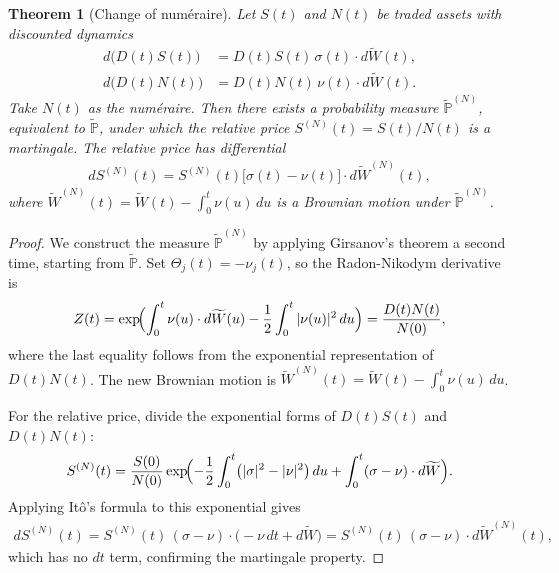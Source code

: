 \documentclass{report}
\theoremstyle{spacedplain}
\newtheorem{theorem}{Theorem}[section]
\theoremstyle{spaceddefinition}
\theoremstyle{spacedremark}
\begin{document}
\begin{theorem}[Change of num\'eraire]
Let $S(t)$ and $N(t)$ be traded assets with discounted dynamics
\begin{align}
    d\bigl(D(t)S(t)\bigr) &= D(t)S(t)\,\sigma(t) \cdot d\widetilde{W}(t), \\
    d\bigl(D(t)N(t)\bigr) &= D(t)N(t)\,\nu(t) \cdot d\widetilde{W}(t).
\end{align}
Take $N(t)$ as the num\'eraire. Then there exists a probability measure $\widetilde{\mathbb{P}}^{(N)}$, equivalent to $\widetilde{\mathbb{P}}$, under which the relative price $S^{(N)}(t) = S(t)/N(t)$ is a martingale. The relative price has differential
\begin{align}
    dS^{(N)}(t) = S^{(N)}(t)\bigl[\sigma(t) - \nu(t)\bigr] \cdot d\widetilde{W}^{(N)}(t),
\end{align}
where $\widetilde{W}^{(N)}(t) = \widetilde{W}(t) - \int_0^t \nu(u)\,du$ is a Brownian motion under $\widetilde{\mathbb{P}}^{(N)}$.
\end{theorem}

\begin{proof}
We construct the measure $\widetilde{\mathbb{P}}^{(N)}$ by applying Girsanov's theorem a second time, starting from $\widetilde{\mathbb{P}}$. Set $\Theta_j(t) = -\nu_j(t)$, so the Radon-Nikodym derivative is
\begin{align}
    Z(t) = \exp\!\Bigl(\int_0^t \nu(u) \cdot d\widetilde{W}(u) - \frac{1}{2}\int_0^t |\nu(u)|^2\,du\Bigr) = \frac{D(t)N(t)}{N(0)},
\end{align}
where the last equality follows from the exponential representation of $D(t)N(t)$. The new Brownian motion is $\widetilde{W}^{(N)}(t) = \widetilde{W}(t) - \int_0^t \nu(u)\,du$.

For the relative price, divide the exponential forms of $D(t)S(t)$ and $D(t)N(t)$:
\begin{align}
    S^{(N)}(t) = \frac{S(0)}{N(0)}\exp\!\Bigl(-\frac{1}{2}\int_0^t\bigl(|\sigma|^2 - |\nu|^2\bigr)\,du + \int_0^t(\sigma - \nu) \cdot d\widetilde{W}\Bigr).
\end{align}
Applying It\^o's formula to this exponential gives
\begin{align}
    dS^{(N)}(t) = S^{(N)}(t)\,(\sigma - \nu) \cdot \bigl(-\nu\,dt + d\widetilde{W}\bigr) = S^{(N)}(t)\,(\sigma - \nu) \cdot d\widetilde{W}^{(N)}(t),
\end{align}
which has no $dt$ term, confirming the martingale property.
\end{proof}
\end{document}
